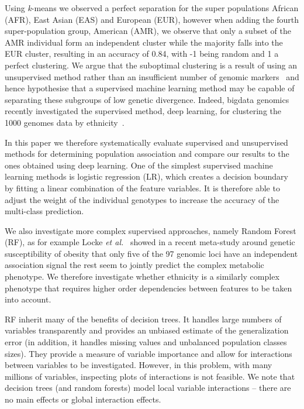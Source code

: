 \documentclass{llncs}
\newcommand{\kMeans}{\textit{k}-means}
\begin{document}
{Using \kMeans{} we observed a perfect separation for the super populations African (AFR), East Asian (EAS) and European
(EUR), however when adding the fourth super-population group, American (AMR), we observe that only a subset of the AMR
individual form an independent cluster while the majority falls into the EUR cluster, resulting in an accuracy of 0.84,
with -1 being random and 1 a perfect clustering.  We argue that the suboptimal clustering is a result of using an
unsupervised method rather than an insufficient number of genomic markers~\cite{Patterson2006} and hence hypothesise
that a supervised machine learning method may be capable of separating these subgroups of low genetic divergence.
Indeed, bigdata genomics recently investigated the supervised method, deep learning, for clustering the 1000 genomes
data by ethnicity~\cite{Ferguson}.

In this paper we therefore systematically evaluate supervised and unsupervised methods for determining population
association and compare our results to the ones obtained using deep learning.
One of the simplest supervised machine learning methods is logistic regression (LR), which creates a decision boundary
by fitting a linear combination of the feature variables.  It is therefore able to adjust the weight of the individual
genotypes to increase the accuracy of the multi-class prediction.


 
We also investigate more complex supervised
approaches, namely Random Forest (RF), as for example Locke {\it et al.}~\cite{Locke2015} showed in a recent meta-study
around genetic susceptibility of obesity that only five of the 97 genomic loci have an independent association signal
the rest seem to jointly predict the complex metabolic phenotype.  We therefore investigate whether ethnicity is a
similarly complex phenotype that requires higher order dependencies between features to be taken into
account. %

RF inherit many of the benefits of decision trees. It handles large numbers of variables transparently and
provides an unbiased estimate of the generalization error (in addition, it handles missing values and unbalanced
population classes sizes). They provide a measure of variable importance and allow for interactions between
variables to be investigated. However, in this problem, with many millions of variables, inspecting plots of interactions
is not feasible.  We note that decision trees (and random forests) model local variable interactions -- there are 
no main effects or global interaction effects. 

}
\end{document}
